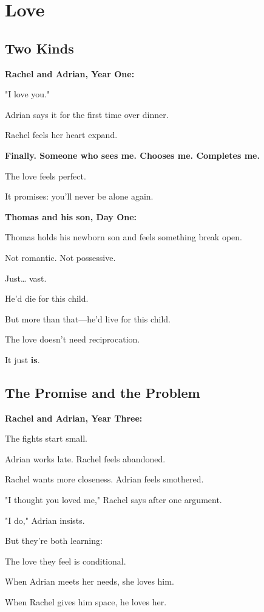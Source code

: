 \documentclass[11pt,twoside]{book}
\begin{document}
\chapter{Love}

\section*{Two Kinds}

\textbf{\textbf{Rachel and Adrian, Year One:}}

"I love you."

Adrian says it for the first time over dinner.

Rachel feels her heart expand.

\textbf{Finally. Someone who sees me. Chooses me. Completes me.}

The love feels perfect.

It promises: you'll never be alone again.

\textbf{\textbf{Thomas and his son, Day One:}}

Thomas holds his newborn son and feels something break open.

Not romantic. Not possessive.

Just\ldots{} vast.

He'd die for this child.

But more than that—he'd live for this child.

The love doesn't need reciprocation.

It just \textbf{is}.

\section*{The Promise and the Problem}

\textbf{\textbf{Rachel and Adrian, Year Three:}}

The fights start small.

Adrian works late. Rachel feels abandoned.

Rachel wants more closeness. Adrian feels smothered.

"I thought you loved me," Rachel says after one argument.

"I do," Adrian insists.

But they're both learning:

The love they feel is conditional.

When Adrian meets her needs, she loves him.

When Rachel gives him space, he loves her.
\end{document}
